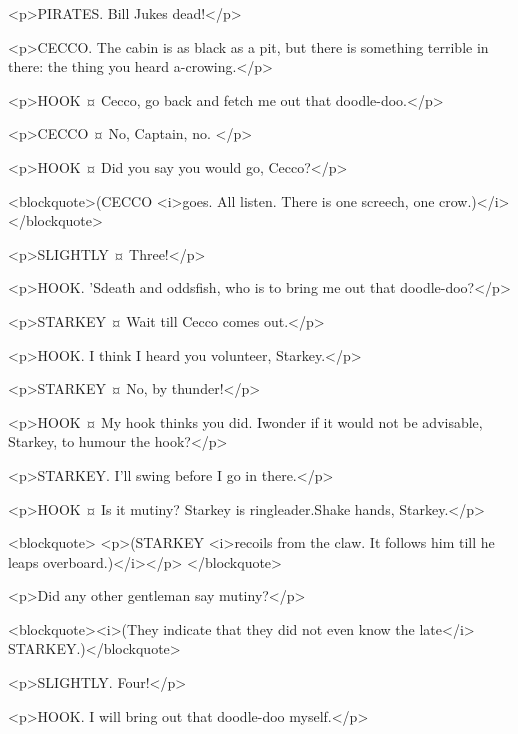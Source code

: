 <p>PIRATES. Bill Jukes dead!</p>

<p>CECCO. The cabin is as black as a pit, but there is something terrible in there: the thing you heard a-crowing.</p>

<p>HOOK ¤
Cecco, go back and fetch me out that doodle-doo.</p>

<p>CECCO ¤
No, Captain, no.
</p>

<p>HOOK ¤
Did you say you would go, Cecco?</p>

<blockquote>(CECCO <i>goes. All listen. There is one screech, one crow.)</i></blockquote>

<p>SLIGHTLY ¤
Three!</p>

<p>HOOK. 'Sdeath and oddsfish, who is to bring me out that doodle-doo?</p>


<p>STARKEY ¤
Wait till Cecco comes out.</p>


<p>HOOK. I think I heard you volunteer, Starkey.</p>

<p>STARKEY ¤
No, by thunder!</p>

<p>HOOK ¤
My hook thinks you did. Iwonder if it would not be advisable, Starkey, to humour the hook?</p>

<p>STARKEY. I'll swing before I go in there.</p>

<p>HOOK ¤
Is it mutiny? Starkey is ringleader.Shake hands, Starkey.</p>

<blockquote> <p>(STARKEY <i>recoils from the claw. It follows him till he leaps overboard.)</i></p> </blockquote>

<p>Did any other gentleman say mutiny?</p>

<blockquote><i>(They indicate that they did not even know the late</i> STARKEY.)</blockquote>

<p>SLIGHTLY. Four!</p>

<p>HOOK. I will bring out that doodle-doo myself.</p>


